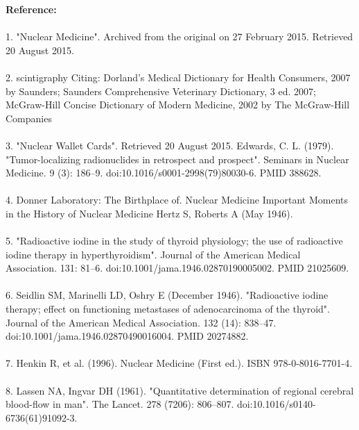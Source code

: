 \documentclass[12pt]{article}
\begin{document}
 

\noindent \textbf{\large Reference:} \\ \\  1. "Nuclear Medicine". Archived from the original on 27 February 2015. Retrieved 20 August 2015.\\ \\
 2. scintigraphy Citing: Dorland's Medical Dictionary for Health Consumers, 2007 by Saunders; Saunders Comprehensive Veterinary Dictionary, 3 ed. 2007; McGraw-Hill Concise Dictionary of Modern Medicine, 2002 by The McGraw-Hill Companies\\ \\
 3. "Nuclear Wallet Cards". Retrieved 20 August 2015.
 Edwards, C. L. (1979). "Tumor-localizing radionuclides in retrospect and prospect". Seminars in Nuclear Medicine. 9 (3): 186–9. doi:10.1016/s0001-2998(79)80030-6. PMID 388628.\\ \\
 4. Donner Laboratory: The Birthplace of. Nuclear Medicine
 Important Moments in the History of Nuclear Medicine
 Hertz S, Roberts A (May 1946).\\ \\ 5. "Radioactive iodine in the study of thyroid physiology; the use of radioactive iodine therapy in hyperthyroidism". Journal of the American Medical Association. 131: 81–6. doi:10.1001/jama.1946.02870190005002. PMID 21025609.\\ \\
 6. Seidlin SM, Marinelli LD, Oshry E (December 1946). "Radioactive iodine therapy; effect on functioning metastases of adenocarcinoma of the thyroid". Journal of the American Medical Association. 132 (14): 838–47. doi:10.1001/jama.1946.02870490016004. PMID 20274882.\\ \\
 7. Henkin R, et al. (1996). Nuclear Medicine (First ed.). ISBN 978-0-8016-7701-4.\\ \\
 8. Lassen NA, Ingvar DH (1961). "Quantitative determination of regional cerebral blood-flow in man". The Lancet. 278 (7206): 806–807. doi:10.1016/s0140-6736(61)91092-3.


\end{document}
